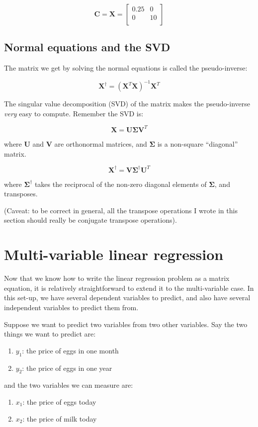\documentclass[11pt]{article}
\newcommand\xmtx{\boldsymbol{X}}
\newcommand\umtx{\boldsymbol{U}}
\newcommand\vmtx{\boldsymbol{V}}
\newcommand\sigmtx{\boldsymbol{\Sigma}}
\newcommand{\mtx}[1]{\boldsymbol{#1}}
\begin{document}
\begin{equation}
    \mtx{C} = \xmtx = 
    \begin{bmatrix}
        0.25 & 0 \\
        0 & 10  \\
    \end{bmatrix}
\end{equation}

\subsection{ Normal equations and the SVD }

The matrix we get by solving the normal equations is called the
pseudo-inverse:

\begin{equation}
    \xmtx^{\dagger} = (\xmtx^T \xmtx)^{-1} \xmtx^T
\end{equation}

The singular value decomposition (SVD) of the matrix makes
the pseudo-inverse \emph{very} easy to compute.
Remember the SVD is:

\begin{equation}
    \xmtx = \umtx \sigmtx \vmtx^T
\end{equation}

where $\umtx$ and $\vmtx$ are orthonormal matrices, and $\sigmtx$
is a non-square ``diagonal'' matrix.

\begin{equation}
    \xmtx^{\dagger} = \vmtx \sigmtx^{\dagger} \umtx^T
\end{equation}

where $\sigmtx^{\dagger}$ takes the reciprocal of the non-zero
diagonal elements of $\sigmtx$, and transposes.

(Caveat: to be correct in general, all the transpose operations I wrote in this section should
really be conjugate transpose operations).


\section{ Multi-variable linear regression }

Now that we know how to write the linear regression problem as a matrix
equation, it is relatively straightforward to extend it to the
multi-variable case. In this set-up, we have several dependent variables to
predict, and also have several independent variables to predict them
from.

Suppose we want to predict two variables from two other variables.
Say the two things we want to predict are:
\begin{enumerate}
    \item $y_1$: the price of eggs in one month
    \item $y_2$: the price of eggs in one year
\end{enumerate}
and the two variables we can measure are:
\begin{enumerate}
    \item $x_1$: the price of eggs today
    \item $x_2$: the price of milk today
\end{enumerate}
\end{document}
